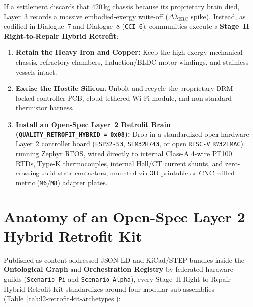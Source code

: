 If a settlement discards that $420\,\mathrm{kg}$ chassis because its proprietary brain died, Layer~3 records a massive embodied-exergy write-off ($\Delta \lambda_{\mathrm{ERC}}$ spike). Instead, as codified in Dialogue~7 and Dialogue~8 (\texttt{CCI-6}), communities execute a \textbf{Stage~II Right-to-Repair Hybrid Retrofit}:
\begin{enumerate}
    \item \textbf{Retain the Heavy Iron and Copper:} Keep the high-exergy mechanical chassis, refractory chambers, Induction/BLDC motor windings, and stainless vessels intact.
    \item \textbf{Excise the Hostile Silicon:} Unbolt and recycle the proprietary DRM-locked controller PCB, cloud-tethered Wi-Fi module, and non-standard thermistor harness.
    \item \textbf{Install an Open-Spec Layer~2 Retrofit Brain (\texttt{QUALITY\_RETROFIT\_HYBRID = 0x08}):} Drop in a standardized open-hardware Layer~2 controller board (\texttt{ESP32-S3}, \texttt{STM32H743}, or open \texttt{RISC-V} \texttt{RV32IMAC}) running Zephyr RTOS, wired directly to internal Class-A 4-wire PT100 RTDs, Type-K thermocouples, internal Hall/CT current shunts, and zero-crossing solid-state contactors, mounted via 3D-printable or CNC-milled metric (\texttt{M6}/\texttt{M8}) adapter plates.
\end{enumerate}

\section{Anatomy of an Open-Spec Layer 2 Hybrid Retrofit Kit}
\label{sec:l2-stage2-kit-anatomy}

Published as content-addressed JSON-LD and KiCad/STEP bundles inside the \textbf{Ontological Graph} and \textbf{Orchestration Registry} by federated hardware guilds (\texttt{Scenario Pi} and \texttt{Scenario Alpha}), every Stage~II Right-to-Repair Hybrid Retrofit Kit standardizes around four modular sub-assemblies (Table~\ref{tab:l2-retrofit-kit-archetypes}):

